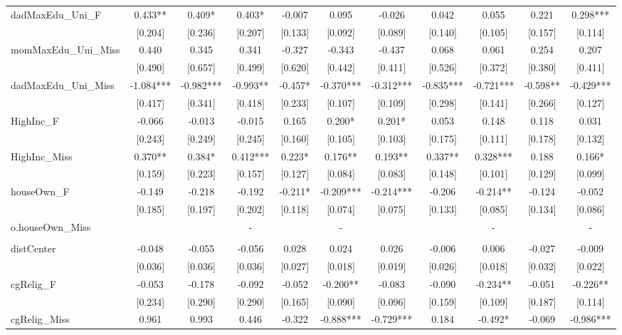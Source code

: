 \documentclass[]{article}
\begin{document}
\begin{tabular}{lcccccccccc}
dadMaxEdu\_Uni\_F & 0.433** & 0.409* & 0.403* & -0.007 & 0.095 & -0.026 & 0.042 & 0.055 & 0.221 & 0.298*** \\
 & [0.204] & [0.236] & [0.207] & [0.133] & [0.092] & [0.089] & [0.140] & [0.105] & [0.157] & [0.114] \\
momMaxEdu\_Uni\_Miss & 0.440 & 0.345 & 0.341 & -0.327 & -0.343 & -0.437 & 0.068 & 0.061 & 0.254 & 0.207 \\
 & [0.490] & [0.657] & [0.499] & [0.620] & [0.442] & [0.411] & [0.526] & [0.372] & [0.380] & [0.411] \\
dadMaxEdu\_Uni\_Miss & -1.084*** & -0.982*** & -0.993** & -0.457* & -0.370*** & -0.312*** & -0.835*** & -0.721*** & -0.598** & -0.429*** \\
 & [0.417] & [0.341] & [0.418] & [0.233] & [0.107] & [0.109] & [0.298] & [0.141] & [0.266] & [0.127] \\
HighInc\_F & -0.066 & -0.013 & -0.015 & 0.165 & 0.200* & 0.201* & 0.053 & 0.148 & 0.118 & 0.031 \\
 & [0.243] & [0.249] & [0.245] & [0.160] & [0.105] & [0.103] & [0.175] & [0.111] & [0.178] & [0.132] \\
HighInc\_Miss & 0.370** & 0.384* & 0.412*** & 0.223* & 0.176** & 0.193** & 0.337** & 0.328*** & 0.188 & 0.166* \\
 & [0.159] & [0.223] & [0.157] & [0.127] & [0.084] & [0.083] & [0.148] & [0.101] & [0.129] & [0.099] \\
houseOwn\_F & -0.149 & -0.218 & -0.192 & -0.211* & -0.209*** & -0.214*** & -0.206 & -0.214** & -0.124 & -0.052 \\
 & [0.185] & [0.197] & [0.202] & [0.118] & [0.074] & [0.075] & [0.133] & [0.085] & [0.134] & [0.086] \\
o.houseOwn\_Miss &  &  & - &  & - &  &  & - &  & - \\
 &  &  &  &  &  &  &  &  &  &  \\
distCenter & -0.048 & -0.055 & -0.056 & 0.028 & 0.024 & 0.026 & -0.006 & 0.006 & -0.027 & -0.009 \\
 & [0.036] & [0.036] & [0.036] & [0.027] & [0.018] & [0.019] & [0.026] & [0.018] & [0.032] & [0.022] \\
cgRelig\_F & -0.053 & -0.178 & -0.092 & -0.052 & -0.200** & -0.083 & -0.090 & -0.234** & -0.051 & -0.226** \\
 & [0.234] & [0.290] & [0.290] & [0.165] & [0.090] & [0.096] & [0.159] & [0.109] & [0.187] & [0.114] \\
cgRelig\_Miss & 0.961 & 0.993 & 0.446 & -0.322 & -0.888*** & -0.729*** & 0.184 & -0.492* & -0.069 & -0.986*** \\

\end{tabular}
\end{document}
